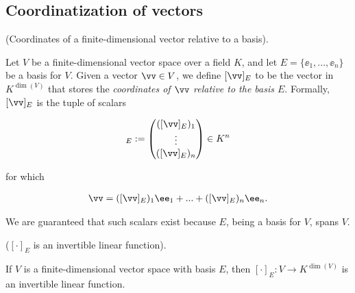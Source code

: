 \subsection*{Coordinatization of vectors}

\begin{defn}
\label{ch::lin_alg::defn::coordinates_relative_to_basis}

    (Coordinates of a finite-dimensional vector relative to a basis).
    
    Let $V$ be a finite-dimensional vector space over a field $K$, and let $E = \{\ee_1, ..., \ee_n\}$ be a basis for $V$. Given a vector $\vv \in V$, we define $[\vv]_E$ to be the vector in $K^{\dim(V)}$ that stores the \textit{coordinates of $\vv$ relative to the basis $E$}. Formally, $[\vv]_E$ is the tuple of scalars 
    
    \begin{align*}
        [\vv]_E := \begin{pmatrix} ([\vv]_E)_1 \\ \vdots \\ ([\vv]_E)_n \end{pmatrix} \in K^n
    \end{align*}
    
    for which
    
    \begin{align*}
        \vv = ([\vv]_E)_1 \ee_1 + ... + ([\vv]_E)_n \ee_n.
    \end{align*}
    
    We are guaranteed that such scalars exist because $E$, being a basis for $V$, spans $V$.
\end{defn}

\begin{theorem}
\label{ch::lin_alg::thm::[]E_invertible}
    ($[\cdot]_E$ is an invertible linear function).
    
    If $V$ is a finite-dimensional vector space with basis $E$, then $[\cdot]_E:V \rightarrow K^{\dim(V)}$ is an invertible linear function.
\end{theorem}

